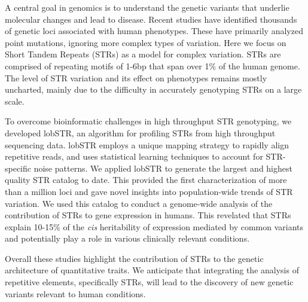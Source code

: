 % 
% 
%

A central goal in genomics is to understand the genetic variants that underlie molecular changes and lead to disease. Recent studies have identified thousands of genetic loci associated with human phenotypes. These have primarily analyzed point mutations, ignoring more complex types of variation. Here we focus on Short Tandem Repeats (STRs) as a model for complex variation. STRs are comprised of repeating motifs of 1-6bp that span over 1\% of the human genome. The level of STR variation and its effect on phenotypes remains mostly uncharted, mainly due to the difficulty in accurately genotyping STRs on a large scale.

To overcome bioinformatic challenges in high throughput STR genotyping, we developed lobSTR, an algorithm for profiling STRs from high throughput sequencing data. lobSTR employs a unique mapping strategy to rapidly align repetitive reads, and uses statistical learning techniques to account for STR-specific noise patterns. We applied lobSTR to generate the largest and highest quality STR catalog to date. This provided the first characterization of more than a million loci and gave novel insights into population-wide trends of STR variation. We used this catalog to conduct a genome-wide analysis of the contribution of STRs to gene expression in humans. This revelated that STRs explain 10-15\% of the \emph{cis} heritability of expression mediated by common variants and potentially play a role in various clinically relevant conditions.

Overall these studies highlight the contribution of STRs to the genetic architecture of quantitative traits. We anticipate that integrating the analysis of repetitive elements, specifically STRs, will lead to the discovery of new genetic variants relevant to human conditions.